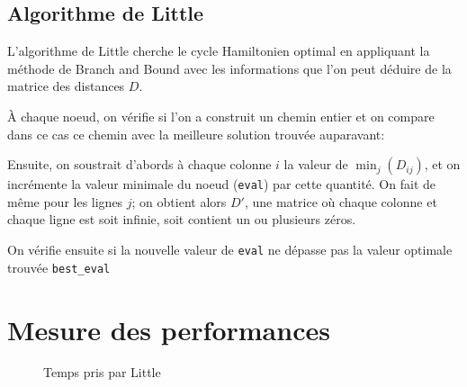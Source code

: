 \documentclass[12pt]{article}
\begin{document}


\subsection{Algorithme de Little}

L'algorithme de Little cherche le cycle Hamiltonien optimal en appliquant la méthode de Branch and Bound avec les informations que l'on peut déduire de la matrice des distances $D$.

À chaque noeud, on vérifie si l'on a construit un chemin entier et on compare dans ce cas ce chemin avec la meilleure solution trouvée auparavant:



Ensuite, on soustrait d'abords à chaque colonne $i$ la valeur de $\min_{j}(D_{ij})$, et on incrémente la valeur minimale du noeud (\texttt{eval}) par cette quantité.
On fait de même pour les lignes $j$; on obtient alors $D'$, une matrice où chaque colonne et chaque ligne est soit infinie, soit contient un ou plusieurs zéros.



On vérifie ensuite si la nouvelle valeur de \texttt{eval} ne dépasse pas la valeur optimale trouvée \texttt{best\_eval}

\section{Mesure des performances}

\begin{figure}[H]
  \caption{Temps pris par Little}

\end{figure}
\end{document}
